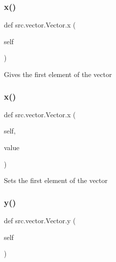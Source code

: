 \subsubsection{\texorpdfstring{x()}{x()}\hspace{0.1cm}{\footnotesize\ttfamily [1/2]}}
{\footnotesize\ttfamily def src.\+vector.\+Vector.\+x (\begin{DoxyParamCaption}\item[{}]{self }\end{DoxyParamCaption})}

\begin{DoxyVerb}Gives the first element of the vector\end{DoxyVerb}
 \mbox{\label{classsrc_1_1vector_1_1Vector_a678951acddfb07e239e0e0e0264bdc79}} 
\subsubsection{\texorpdfstring{x()}{x()}\hspace{0.1cm}{\footnotesize\ttfamily [2/2]}}
{\footnotesize\ttfamily def src.\+vector.\+Vector.\+x (\begin{DoxyParamCaption}\item[{}]{self,  }\item[{}]{value }\end{DoxyParamCaption})}

\begin{DoxyVerb}Sets the first element of the vector\end{DoxyVerb}
 \mbox{\label{classsrc_1_1vector_1_1Vector_a9c713a7446061715b080c9c8378a9ef5}} 
\subsubsection{\texorpdfstring{y()}{y()}\hspace{0.1cm}{\footnotesize\ttfamily [1/2]}}
{\footnotesize\ttfamily def src.\+vector.\+Vector.\+y (\begin{DoxyParamCaption}\item[{}]{self }\end{DoxyParamCaption})}

